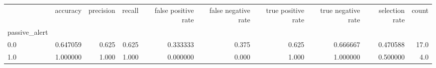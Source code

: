\begin{tabular}{lrrrrrrrrr}
\toprule
{} &  accuracy &  precision &  recall &  false positive rate &  false negative rate &  true positive rate &  true negative rate &  selection rate &  count \\
passive\_alert &           &            &         &                      &                      &                     &                     &                 &        \\
\midrule
0.0           &  0.647059 &      0.625 &   0.625 &             0.333333 &                0.375 &               0.625 &            0.666667 &        0.470588 &   17.0 \\
1.0           &  1.000000 &      1.000 &   1.000 &             0.000000 &                0.000 &               1.000 &            1.000000 &        0.500000 &    4.0 \\
\bottomrule
\end{tabular}
